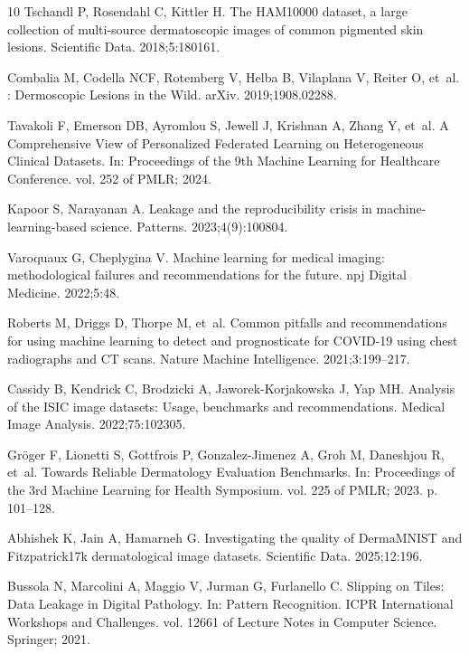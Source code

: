 \documentclass[VANCOUVER,Times1COL]{WileyNJDv5}
\begin{document}
\begin{thebibliography}{10}
Tschandl P, Rosendahl C, Kittler H.
\newblock The {HAM10000} dataset, a large collection of multi-source
  dermatoscopic images of common pigmented skin lesions.
\newblock Scientific Data. 2018;5:180161.

Combalia M, Codella NCF, Rotemberg V, Helba B, Vilaplana V, Reiter O, et~al.
: Dermoscopic Lesions in the Wild.
\newblock arXiv. 2019;1908.02288.

Tavakoli F, Emerson DB, Ayromlou S, Jewell J, Krishnan A, Zhang Y, et~al.
\newblock A Comprehensive View of Personalized Federated Learning on
  Heterogeneous Clinical Datasets.
\newblock In: Proceedings of the 9th Machine Learning for Healthcare
  Conference. vol. 252 of PMLR; 2024.

Kapoor S, Narayanan A.
\newblock Leakage and the reproducibility crisis in machine-learning-based
  science.
\newblock Patterns. 2023;4(9):100804.

Varoquaux G, Cheplygina V.
\newblock Machine learning for medical imaging: methodological failures and
  recommendations for the future.
\newblock npj Digital Medicine. 2022;5:48.

Roberts M, Driggs D, Thorpe M, et~al.
\newblock Common pitfalls and recommendations for using machine learning to
  detect and prognosticate for {COVID-19} using chest radiographs and {CT}
  scans.
\newblock Nature Machine Intelligence. 2021;3:199--217.

Cassidy B, Kendrick C, Brodzicki A, Jaworek-Korjakowska J, Yap MH.
\newblock Analysis of the {ISIC} image datasets: Usage, benchmarks and
  recommendations.
\newblock Medical Image Analysis. 2022;75:102305.

Gr{\"o}ger F, Lionetti S, Gottfrois P, Gonzalez-Jimenez A, Groh M, Daneshjou R,
  et~al.
\newblock Towards Reliable Dermatology Evaluation Benchmarks.
\newblock In: Proceedings of the 3rd Machine Learning for Health Symposium.
  vol. 225 of PMLR; 2023. p. 101--128.

Abhishek K, Jain A, Hamarneh G.
\newblock Investigating the quality of {DermaMNIST} and {Fitzpatrick17k}
  dermatological image datasets.
\newblock Scientific Data. 2025;12:196.

Bussola N, Marcolini A, Maggio V, Jurman G, Furlanello C.
 Slipping on Tiles: Data Leakage in Digital Pathology.
\newblock In: Pattern Recognition. ICPR International Workshops and Challenges.
  vol. 12661 of Lecture Notes in Computer Science. Springer; 2021.


\end{thebibliography}
\end{document}
